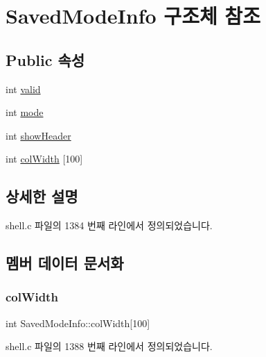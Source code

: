 \hypertarget{struct_saved_mode_info}{}\section{Saved\+Mode\+Info 구조체 참조}
\label{struct_saved_mode_info}
\subsection*{Public 속성}
\begin{DoxyCompactItemize}
\item 
int \hyperlink{struct_saved_mode_info_a43e863fb285c2aad913087572ebd5e27}{valid}
\item 
int \hyperlink{struct_saved_mode_info_ab6d30b28565d51ca017904f70b5edac6}{mode}
\item 
int \hyperlink{struct_saved_mode_info_a73fa5b451f94fa75fb5e27887831b8f4}{show\+Header}
\item 
int \hyperlink{struct_saved_mode_info_add96e86a9293b5e1bfd3ab92bf1a365f}{col\+Width} \mbox{[}100\mbox{]}
\end{DoxyCompactItemize}


\subsection{상세한 설명}


shell.\+c 파일의 1384 번째 라인에서 정의되었습니다.



\subsection{멤버 데이터 문서화}
\mbox{\label{struct_saved_mode_info_add96e86a9293b5e1bfd3ab92bf1a365f}} 
\subsubsection{\texorpdfstring{col\+Width}{colWidth}}
{\footnotesize\ttfamily int Saved\+Mode\+Info\+::col\+Width\mbox{[}100\mbox{]}}



shell.\+c 파일의 1388 번째 라인에서 정의되었습니다.

\mbox{\label{struct_saved_mode_info_ab6d30b28565d51ca017904f70b5edac6}} 
